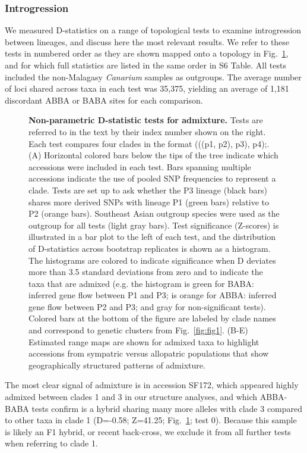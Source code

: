 \documentclass[10pt,letterpaper]{article}
\begin{document}
\subsubsection*{Introgression}
We measured D-statistics on a range of topological tests to examine introgression between lineages, and discuss here the most relevant results. We refer to these tests in numbered order as they are shown mapped onto a topology in Fig.~\ref{fig:fig3}, and for which full statistics are listed in the same order in S6 Table. %
All tests included the non-Malagasy \emph{Canarium} samples as outgroups. The average number of loci shared across taxa in each test was 35,375, yielding an average of 1,181 discordant ABBA or BABA sites for each comparison. 


\begin{figure}[!h]
  \caption{{\bf Non-parametric D-statistic tests for admixture.}
    Tests are referred to in the text by their index number shown on the right. Each test compares
    four clades in the format (((p1, p2), p3), p4);. (A) Horizontal colored bars below the tips of
    the tree indicate which accessions were included in each test. Bars spanning multiple accessions
    indicate the use of pooled SNP frequencies to represent a clade. Tests are set up to ask whether
    the P3 lineage (black bars) shares more derived SNPs with lineage P1 (green bars) relative to P2
    (orange bars). Southeast Asian outgroup species were used as the outgroup for all tests (light gray bars). Test significance (Z-scores) is illustrated in a bar plot to the left of each test, and the distribution of D-statistics across bootstrap replicates is shown as a histogram. The histograms are colored to indicate significance when D deviates more than 3.5 standard deviations from zero and to indicate the taxa that are admixed (e.g. the histogram is green for BABA: inferred gene flow between P1 and P3; is orange for ABBA: inferred gene flow between P2 and P3; and gray for non-significant tests). Colored bars at the bottom of the figure are labeled by clade names and correspond to genetic clusters from Fig.~\ref{fig:fig1}. (B-E) Estimated range maps are shown for admixed taxa to highlight accessions from sympatric versus allopatric populations that show geographically structured patterns of admixture.}
  \label{fig:fig3}
\end{figure}




The most clear signal of admixture is in accession SF172, which appeared highly admixed between clades 1 and 3 in our structure analyses, and which ABBA-BABA tests confirm is a hybrid sharing many more alleles with clade 3 compared to other taxa in clade 1 (D=-0.58; Z=41.25; Fig.~\ref{fig:fig3}; test 0). Because this sample is likely an F1 hybrid, or recent back-cross, we exclude it from all further tests when referring to clade 1. 
\end{document}
